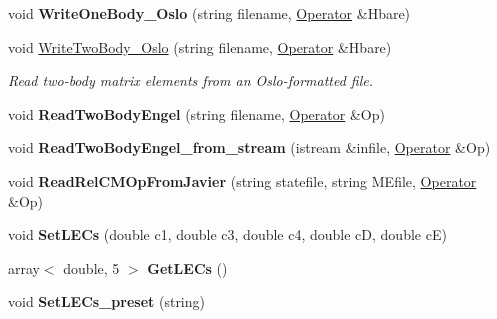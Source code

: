 \begin{DoxyCompactItemize}
\item 
void {\bfseries Write\+One\+Body\+\_\+\+Oslo} (string filename, \hyperlink{classOperator}{Operator} \&Hbare)\hypertarget{classReadWrite_a13494cd64fa5cd54c235494f2f6ad98a}{}\label{classReadWrite_a13494cd64fa5cd54c235494f2f6ad98a}

\item 
void \hyperlink{classReadWrite_a7f1aa9a0701a15d2007524f7d31df1ef}{Write\+Two\+Body\+\_\+\+Oslo} (string filename, \hyperlink{classOperator}{Operator} \&Hbare)\hypertarget{classReadWrite_a7f1aa9a0701a15d2007524f7d31df1ef}{}\label{classReadWrite_a7f1aa9a0701a15d2007524f7d31df1ef}

\begin{DoxyCompactList}\small\item\em Read two-\/body matrix elements from an Oslo-\/formatted file. \end{DoxyCompactList}\item 
void {\bfseries Read\+Two\+Body\+Engel} (string filename, \hyperlink{classOperator}{Operator} \&Op)\hypertarget{classReadWrite_a6d9f3e742be006c9b13eaf0670e58b99}{}\label{classReadWrite_a6d9f3e742be006c9b13eaf0670e58b99}

\item 
void {\bfseries Read\+Two\+Body\+Engel\+\_\+from\+\_\+stream} (istream \&infile, \hyperlink{classOperator}{Operator} \&Op)\hypertarget{classReadWrite_a7bc3e52488d9c68eff73e7fdf21c2902}{}\label{classReadWrite_a7bc3e52488d9c68eff73e7fdf21c2902}

\item 
void {\bfseries Read\+Rel\+C\+M\+Op\+From\+Javier} (string statefile, string M\+Efile, \hyperlink{classOperator}{Operator} \&Op)\hypertarget{classReadWrite_adc83e4b1e3c72197b3f4e8058253614d}{}\label{classReadWrite_adc83e4b1e3c72197b3f4e8058253614d}

\item 
void {\bfseries Set\+L\+E\+Cs} (double c1, double c3, double c4, double cD, double cE)\hypertarget{classReadWrite_a10180e94275661120691d68111df58ad}{}\label{classReadWrite_a10180e94275661120691d68111df58ad}

\item 
array$<$ double, 5 $>$ {\bfseries Get\+L\+E\+Cs} ()\hypertarget{classReadWrite_a5d8d1131eddbf866c0003fa622e0e165}{}\label{classReadWrite_a5d8d1131eddbf866c0003fa622e0e165}

\item 
void {\bfseries Set\+L\+E\+Cs\+\_\+preset} (string)\hypertarget{classReadWrite_a537f1835dd4d3d4b25f0a270d8a0984c}{}\label{classReadWrite_a537f1835dd4d3d4b25f0a270d8a0984c}


\end{DoxyCompactItemize}
